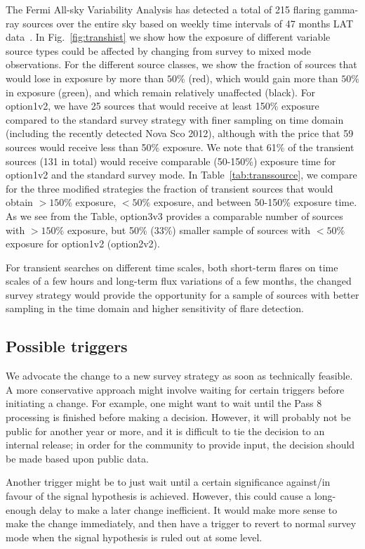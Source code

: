 \documentclass[aps,prd,superscriptaddress,nofootinbib,fixlfloat, 12pt]{revtex4-1}
\begin{document}
The Fermi All-sky Variability Analysis has detected a total
of 215 flaring gamma-ray sources over the entire sky based
on weekly time intervals of 47 months LAT
data~\cite{Fermi-LAT:2013jsa}. In Fig.~\ref{fig:transhist}
we show how the exposure of different variable source types
could be affected by changing from survey to mixed mode
observations. For the different source classes, we show the
fraction of sources that would lose in exposure by more than
$50\%$ (red), which would gain more than $50\%$ in exposure
(green), and which remain relatively unaffected (black). For
option1v2, we have 25 sources that would receive at least
150\% exposure compared to the standard survey strategy with
finer sampling on time domain (including the recently
detected Nova Sco 2012), although with the price that 59
sources would receive less than 50\% exposure. We note that
61\% of the transient sources (131 in total) would receive
comparable (50-150\%) exposure time for option1v2 and the
standard survey mode.  In Table~\ref{tab:transsource}, we
compare for the three modified strategies the fraction of
transient sources that would obtain $>150\%$ exposure,
$<50\%$ exposure, and between 50-150$\%$ exposure time. As
we see from the Table, option3v3 provides a comparable
number of sources with $>150\%$ exposure, but 50\% (33\%)
smaller sample of sources with $<50\%$ exposure for
option1v2 (option2v2).

For transient searches on different time scales, both
short-term flares on time scales of a few hours and
long-term flux variations of a few months, the changed survey
strategy would provide the opportunity for a sample of sources
with better sampling in the time domain and higher sensitivity
of flare detection.


\subsection{Possible triggers}
We advocate the change to a new survey strategy as soon as technically
feasible. A more conservative approach might involve waiting for certain
triggers before initiating a change. For example, one might want to wait until
the Pass 8 processing is finished before making a decision.  However, it will
probably not be public for another year or more, and it is difficult to tie
the decision to an internal release; in order for the community to provide
input, the decision should be made based upon public data. 

Another trigger might be to just wait until a certain significance against/in
favour of the signal hypothesis is achieved. However, this could cause a
long-enough delay to make a later change inefficient. It would make more sense
to make the change immediately, and then have a trigger to revert to normal
survey mode when the signal hypothesis is ruled out at some level.
\end{document}
